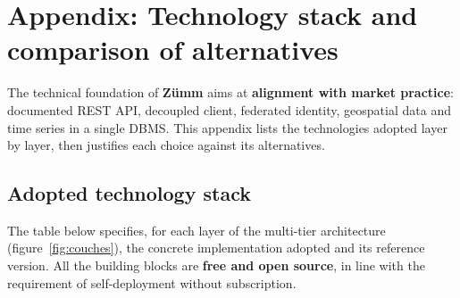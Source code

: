 
\chapter{Appendix: Technology stack and comparison of alternatives}
\label{chap:technologies}
The technical foundation of \textbf{Zümm} aims at \textbf{alignment with market
practice}: documented REST API, decoupled client, federated identity, geospatial
data and time series in a single DBMS. This appendix lists the technologies
adopted layer by layer, then justifies each choice against its alternatives.

\section{Adopted technology stack}
The table below specifies, for each layer of the multi-tier architecture
(figure~\ref{fig:couches}), the concrete implementation adopted and its
reference version. All the building blocks are \textbf{free and open source}, in
line with the requirement of self-deployment without subscription.

